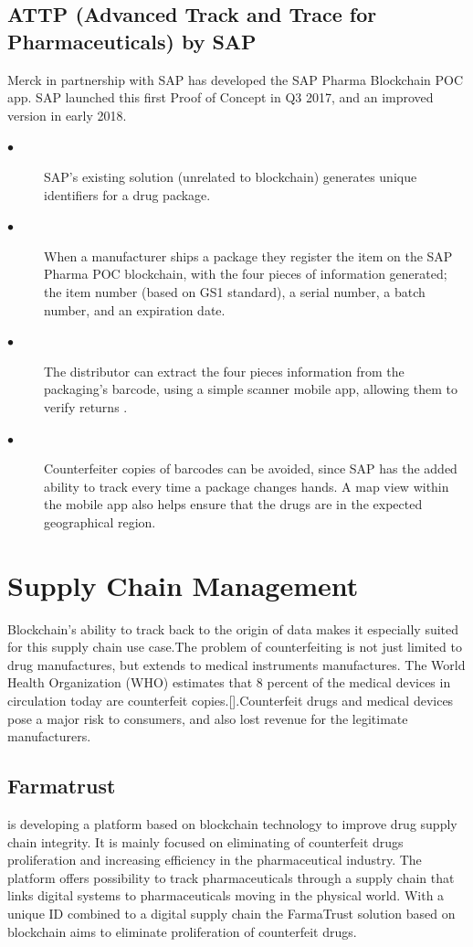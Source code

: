 \documentclass[12pt]{report}
\begin{document}
\subsection{ATTP (Advanced Track and Trace for Pharmaceuticals) by SAP \cite{15}}
Merck in partnership with SAP has developed the SAP Pharma Blockchain POC app. SAP launched this first Proof of Concept in Q3 2017, and an improved version in early 2018.
\begin{description}
\item[$\bullet$]SAP’s existing solution (unrelated to blockchain) generates unique identifiers for a drug package.
\item[$\bullet$]When a manufacturer ships a package they register the item on the SAP Pharma POC blockchain, with the four pieces of information generated; the item number (based on GS1 standard), a serial number, a batch number, and an expiration date.
\item[$\bullet$]The distributor can extract the four pieces information from the packaging’s barcode, using a simple scanner mobile app, allowing them to verify returns .
\item[$\bullet$]Counterfeiter copies of barcodes can be avoided, since SAP has the added ability to track every time a package changes hands. A map view within the mobile app also helps ensure that the drugs are in the expected geographical region.
\end{description}
\section{Supply Chain Management}
Blockchain’s ability to track back to the origin of data makes it especially suited for this supply chain use case.The problem of counterfeiting is not just limited to drug manufactures, but extends to medical instruments manufactures. The World Health Organization (WHO) estimates that 8 percent of the medical devices in circulation today are counterfeit copies.[].Counterfeit drugs and medical devices pose a major risk to consumers, and also lost revenue for the legitimate manufacturers.
\subsection{Farmatrust\cite{16}}
is developing a platform based on blockchain technology to improve drug supply chain integrity. It is mainly focused on eliminating of counterfeit drugs proliferation and increasing efficiency in the pharmaceutical industry. The platform offers possibility to track pharmaceuticals through a supply chain that links digital systems to pharmaceuticals moving in the physical world. With a unique ID combined to a digital supply chain the FarmaTrust solution based on blockchain aims to eliminate proliferation of counterfeit drugs.
 
\end{document}
